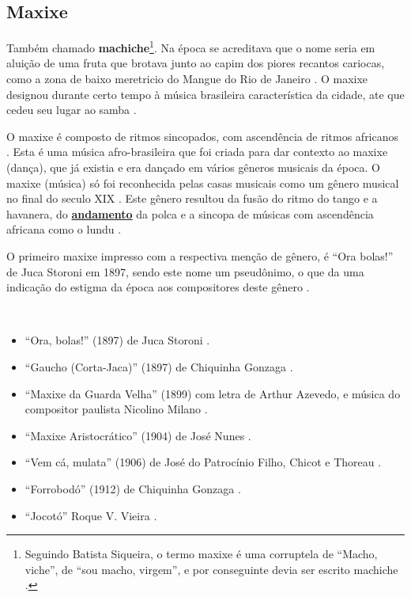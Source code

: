 \subsection{Maxixe}
Também chamado \textbf{machiche}\footnote{Seguindo Batista Siqueira, 
o termo maxixe é uma corruptela de ``Macho, viche'', 
de ``sou macho, virgem'', e por conseguinte devia ser escrito machiche \cite[pp. 198]{dourado2004dicionario}.}.
Na época se acreditava que o nome seria em aluição de uma fruta que brotava junto ao capim dos piores recantos cariocas,
como a zona de baixo meretricio do Mangue do Rio de Janeiro \cite[pp. 198]{dourado2004dicionario}.
O maxixe designou durante certo tempo à música brasileira característica da cidade, 
ate que cedeu seu lugar ao samba \cite[pp. 4]{musicasambavariasdef1}.

O maxixe é composto de ritmos sincopados, com ascendência de ritmos africanos \cite[pp. 198]{dourado2004dicionario}.
Esta é uma música afro-brasileira \cite[pp. 4]{musicasambavariasdef1} 
que foi criada para dar contexto ao  maxixe (dança), que já existia e era dançado em vários gêneros musicais da época.
O maxixe (música) só foi reconhecida pelas casas musicais como um gênero musical no final do seculo XIX \cite[pp. 465]{marcondes1977enciclopedia}. 
Este gênero resultou da fusão do ritmo do tango e a havanera, 
do \hyperref[sec:Andamento]{\textbf{andamento}} da polca e 
a sincopa de músicas com ascendência africana como o lundu  \cite[pp. 29]{efege1974maxixe}  \cite[pp. 465]{marcondes1977enciclopedia}. 

O primeiro maxixe impresso com a respectiva menção de gênero, é ``Ora bolas!'' de Juca Storoni em 1897,
sendo este nome um pseudônimo, o que da uma indicação do estigma da época aos compositores deste gênero \cite[pp. 80]{sandroni2001feitico} \cite[pp. 108]{efege1974maxixe}.

\begin{example} ~

\begin{itemize}
\item ``Ora, bolas!'' (1897) de Juca Storoni \cite[pp. 108]{efege1974maxixe}.
\item ``Gaucho (Corta-Jaca)'' (1897) de Chiquinha Gonzaga \cite{reportagemtvmaxixe} \cite[pp. 30]{efege1974maxixe}.
\item ``Maxixe da Guarda Velha'' (1899) com letra de Arthur Azevedo, 
e música do compositor paulista Nicolino Milano  \cite{reportagemtvmaxixe}. 
\item ``Maxixe Aristocrático'' (1904) de José Nunes \cite{REIS2003}.
\item ``Vem cá, mulata'' (1906) de José do Patrocínio Filho, Chicot e Thoreau \cite{REIS2003}.
\item ``Forrobodó'' (1912) de Chiquinha Gonzaga \cite{REIS2003} \cite{reportagemtvmaxixe}.
\item ``Jocotó'' Roque V. Vieira \cite{reportagemtvmaxixe}.
\end{itemize}
\end{example}

